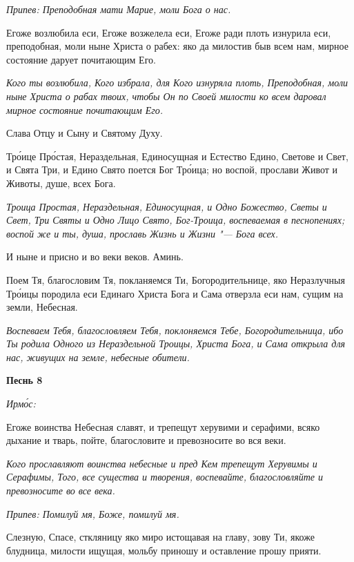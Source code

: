 \itshape Припев:\normalfont{} Преподобная мати Марие, моли Бога о нас.


Егоже возлюбила еси, Егоже возжелела еси, Егоже ради плоть изнурила еси, преподобная, моли ныне Христа о рабех: яко да милостив быв всем нам, мирное состояние дарует почитающим Его.


\itshape Кого ты возлюбила, Кого избрала, для Кого изнуряла плоть, Преподобная, моли ныне Христа о рабах твоих, чтобы Он по Своей милости ко всем даровал мирное состояние почитающим Его.\normalfont{}


Слава Отцу и Сыну и Святому Духу.


Тро́ице Про́стая, Нераздельная, Единосущная и Естество Едино, Светове и Свет, и Свята Три, и Едино Свято поется Бог Тро́ица; но воспой, прослави Живот и Животы, душе, всех Бога.


\itshape Троица Простая, Нераздельная, Единосущная, и Одно Божество, Светы и Свет, Три Святы и Одно Лицо Свято, Бог-Троица, воспеваемая в песнопениях; воспой же и ты, душа, прославь Жизнь и Жизни "--- Бога всех.\normalfont{}


И ныне и присно и во веки веков. Аминь.


Поем Тя, благословим Тя, покланяемся Ти, Богородительнице, яко Неразлучныя Тро́ицы породила еси Единаго Христа Бога и Сама отверзла еси нам, сущим на земли, Небесная.


\itshape Воспеваем Тебя, благословляем Тебя, поклоняемся Тебе, Богородительница, ибо Ты родила Одного из Нераздельной Троицы, Христа Бога, и Сама открыла для нас, живущих на земле, небесные обители.\normalfont{}





\bfseries Песнь 8\normalfont{}


\itshape Ирмо́с:\normalfont{}


Егоже воинства Небесная славят, и трепещут херувими и серафими, всяко дыхание и тварь, пойте, благословите и превозносите во вся веки.


\itshape Кого прославляют воинства небесные и пред Кем трепещут Херувимы и Серафимы, Того, все существа и творения, воспевайте, благословляйте и превозносите во все века.\normalfont{}


\itshape Припев:\normalfont{} Помилуй мя, Боже, помилуй мя.


Слезную, Спасе, сткляницу яко миро истощавая на главу, зову Ти, якоже блудница, милости ищущая, мольбу приношу и оставление прошу прияти.


